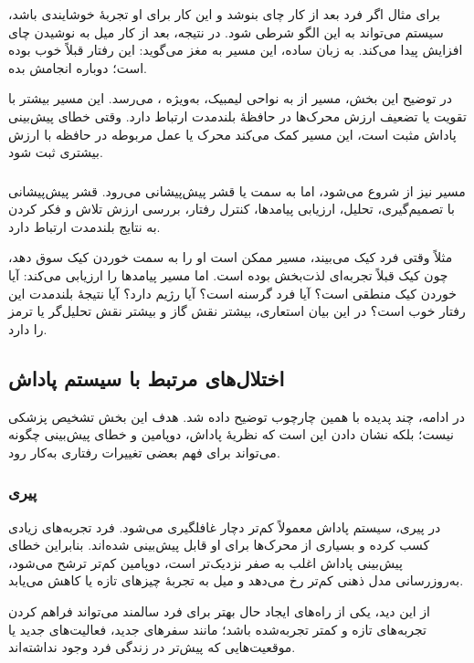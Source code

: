 برای مثال اگر فرد بعد از کار چای بنوشد و این کار برای او تجربهٔ خوشایندی باشد، سیستم  می‌تواند به این الگو شرطی شود. در نتیجه، بعد از کار میل به نوشیدن چای افزایش پیدا می‌کند. به زبان ساده، این مسیر به مغز می‌گوید: این رفتار قبلاً خوب بوده است؛ دوباره انجامش بده.

در توضیح این بخش، مسیر  از  به نواحی لیمبیک، به‌ویژه ، می‌رسد. این مسیر بیشتر با تقویت یا تضعیف ارزش محرک‌ها در حافظهٔ بلندمدت ارتباط دارد. وقتی خطای پیش‌بینی پاداش مثبت است، این مسیر کمک می‌کند محرک یا عمل مربوطه در حافظه با ارزش بیشتری ثبت شود.

\subsubsection{}
مسیر  نیز از  شروع می‌شود، اما به سمت  یا قشر پیش‌پیشانی می‌رود. قشر پیش‌پیشانی با تصمیم‌گیری، تحلیل، ارزیابی پیامدها، کنترل رفتار، بررسی ارزش تلاش و فکر کردن به نتایج بلندمدت ارتباط دارد.

مثلاً وقتی فرد کیک می‌بیند، مسیر  ممکن است او را به سمت خوردن کیک سوق دهد، چون کیک قبلاً تجربه‌ای لذت‌بخش بوده است. اما مسیر  پیامدها را ارزیابی می‌کند: آیا خوردن کیک منطقی است؟ آیا فرد گرسنه است؟ آیا رژیم دارد؟ آیا نتیجهٔ بلندمدت این رفتار خوب است؟ در این بیان استعاری،  بیشتر نقش گاز و  بیشتر نقش تحلیل‌گر یا ترمز را دارد.

\subsection{اختلال‌های مرتبط با سیستم پاداش}
در ادامه، چند پدیده با همین چارچوب توضیح داده شد. هدف این بخش تشخیص پزشکی نیست؛ بلکه نشان دادن این است که نظریهٔ پاداش، دوپامین و خطای پیش‌بینی چگونه می‌تواند برای فهم بعضی تغییرات رفتاری به‌کار رود.

\subsubsection{پیری}
در پیری، سیستم پاداش معمولاً کم‌تر دچار غافلگیری می‌شود. فرد تجربه‌های زیادی کسب کرده و بسیاری از محرک‌ها برای او قابل پیش‌بینی شده‌اند. بنابراین خطای پیش‌بینی پاداش اغلب به صفر نزدیک‌تر است، دوپامین کم‌تر ترشح می‌شود، به‌روزرسانی مدل ذهنی کم‌تر رخ می‌دهد و میل به تجربهٔ چیزهای تازه یا  کاهش می‌یابد.

از این دید، یکی از راه‌های ایجاد حال بهتر برای فرد سالمند می‌تواند فراهم کردن تجربه‌های تازه و کمتر تجربه‌شده باشد؛ مانند سفرهای جدید، فعالیت‌های جدید یا موقعیت‌هایی که پیش‌تر در زندگی فرد وجود نداشته‌اند.


